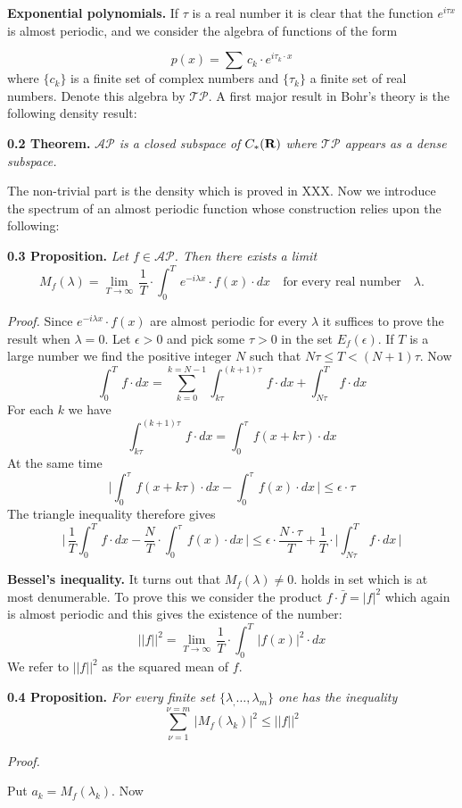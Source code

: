 \documentclass{amsart}
\def\uuu{_}
\def\vvv{-}
\begin{document}
{\noindent
{\bf{Exponential polynomials.}}
 If $\tau$ is a real number it is clear that
the function $e^{i\tau x}$ is almost periodic, and 
we consider the  algebra of functions of the form

\[
p(x)= \sum\, c\uuu k\cdot e^{i\tau\uuu k\cdot x}
\]
where $\{c\uuu k\}$ is a finite set of complex numbers
and $\{\tau\uuu k\}$ a finite set of real numbers.
Denote this algebra by   $\mathcal {TP}$.
A first major result in Bohr's theory is
the following density result:

\medskip

\noindent
{\bf {0.2 Theorem.}}
\emph{$\mathcal {AP}$ is a closed subspace of
$C\uuu *({\bf{R}})$ where
$\mathcal {TP}$ appears as a dense
subspace.}


\bigskip

\noindent
The non\vvv trivial part  is the density
which is  proved in XXX.
Now we  introduce 
the spectrum of an almost periodic function
whose construction relies upon the following:


\medskip

\noindent
{\bf{0.3 Proposition.}} \emph{Let $f\in \mathcal{AP}$. Then there exists a limit}
\[
M\uuu f(\lambda)=\lim\uuu {T\to\infty}\, \frac{1}{T}\cdot \int\uuu 0^T\,
e^{\vvv i\lambda x}\cdot f(x)\cdot dx\quad\text{for every real number}\quad  \lambda.
\]
\medskip

\noindent
\emph{Proof.}
Since $e^{\vvv i\lambda x}\cdot f(x)$ are almost periodic for every
$\lambda$ it suffices to prove the result when $\lambda=0$.
Let  $\epsilon>0$ and pick some $\tau>0$ in the set
$E\uuu f(\epsilon)$. If $T$ is a large number we find
the positive integer $N$ such that
$N\tau\leq T<(N+1)\tau$.
Now
\[ 
\int\uuu 0^T\,  f\cdot dx=
\sum\uuu{k=0}^{k=N\vvv 1}
\int\uuu {k\tau}^{(k+1)\tau}\, f\cdot dx+
\int\uuu {N\tau}^T\, f\cdot dx\tag{i}
\]
For each $k$ we have
\[
\int\uuu {k\tau}^{(k+1)\tau}\, f\cdot dx=
\int\uuu 0^\tau\, f(x+k\tau)\cdot dx
\] 
At the same time
\[
\bigl|\int\uuu 0^\tau\, f(x+k\tau)\cdot dx
\vvv\int\uuu 0^\tau\, f(x)\cdot dx\,\bigr|\leq \epsilon\cdot \tau
\]
The triangle inequality
therefore gives
\[
\bigl|\, 
\frac{1}{T}\int\uuu 0^T\,  f\cdot dx
\vvv \frac{N}{T}\cdot \int \uuu 0^\tau\, f(x)\cdot dx\,
\bigr|
\leq \epsilon\cdot \frac{N\cdot \tau}{T}+
\frac{1}{T}\cdot \bigl|\int\uuu {N\tau}^T\, f\cdot dx\,\bigr|
\]


\medskip

\noindent
{\bf{Bessel's inequality.}}
It turns out that $M\uuu f(\lambda)\neq 0$.
holds in set which is at most
denumerable.
To prove  this we consider the product $f\cdot \bar f=|f|^2$ which again is
almost periodic  and this gives the existence of the  number:
\[
||f||^2=\lim\uuu {T\to\infty}\, \frac{1}{T}\cdot \int\uuu 0^T\,
 |f(x)|^2\cdot dx\tag{*}
\]
We refer to $||f||^2$ as the squared mean of $f$.

\medskip

\noindent
{\bf{0.4 Proposition.}} \emph{For every 
finite set $\{\lambda\uuu ,\ldots,\lambda\uuu m\}$
one has the inequality}
\[
\sum\uuu {\nu=1}^{\nu=m}\,
 |M\uuu f(\lambda\uuu  k) |^2\leq ||f||^2
\]
\medskip

\noindent
\emph{Proof.}} Put $a\uuu k=M\uuu f(\lambda\uuu  k)$. Now
\end{document}
